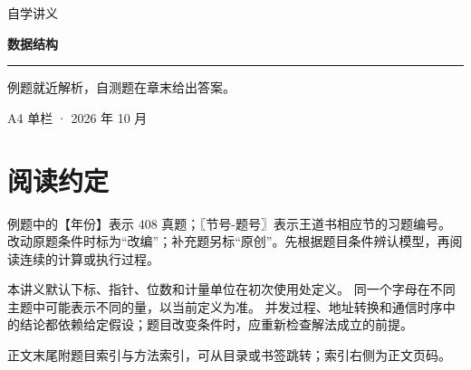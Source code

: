 
\newcommand{\BookTitle}{数据结构}

\begin{titlepage}
\thispagestyle{empty}
\vspace*{25mm}
{\sffamily\color{accent}\fontsize{16}{24} 自学讲义}\par
\vspace{15mm}
{\sffamily\bfseries\color{ink}\fontsize{32}{45}\selectfont 数据结构}\par
\vspace{15mm}
\noindent\rule{\textwidth}{0.5pt}\par
\vspace{5mm}
\noindent 例题就近解析，自测题在章末给出答案。\par
\vfill
\noindent A4 单栏 · 2026 年 10 月\par
\end{titlepage}
\tableofcontents
\clearpage
{}\chapter*{阅读约定}
例题中的【年份】表示 408 真题；〖节号-题号〗表示王道书相应节的习题编号。
改动原题条件时标为“改编”；补充题另标“原创”。先根据题目条件辨认模型，再阅读连续的计算或执行过程。

本讲义默认下标、指针、位数和计量单位在初次使用处定义。
同一个字母在不同主题中可能表示不同的量，以当前定义为准。
并发过程、地址转换和通信时序中的结论都依赖给定假设；题目改变条件时，应重新检查解法成立的前提。

正文末尾附题目索引与方法索引，可从目录或书签跳转；索引右侧为正文页码。
\clearpage
{}
\setcounter{chapter}{0}



